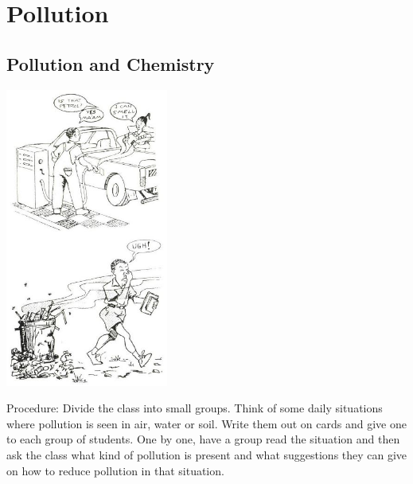 \section{Pollution}

\begin{multicols}{2}


\subsection{Pollution and Chemistry}

\begin{center}
\includegraphics[width=0.4\textwidth]{./img/source/air-pollution.jpg}
\end{center}

\begin{description*}
\item[Procedure:]{Divide the class into small groups. Think of some daily situations where pollution is seen in air, water or soil. Write them out on cards and give one to each group of students. One by one, have a group read the situation and then ask the class what kind of pollution is present and what suggestions they can give on how to reduce pollution in that situation.}
\end{description*}


\end{multicols}

